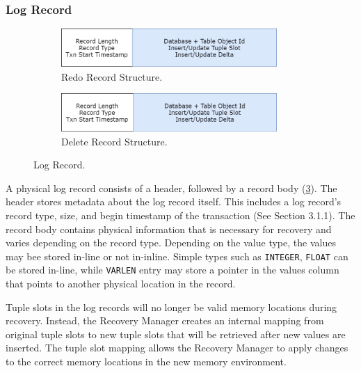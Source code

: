 \documentclass[12pt]{cmuthesis}
\begin{document}
\subsubsection{Log Record}
\begin{figure}[t!]
\centering
\begin{subfigure}{.5\textwidth}
 \centering
 \includegraphics[width=0.9\textwidth]{images/RedoRecord.png}
 \caption{Redo Record Structure.}
  \label{fig:pipeline_graph}
\end{subfigure}%
\begin{subfigure}{.5\textwidth}
 \centering
 \includegraphics[width=0.9\textwidth]{images/DeleteRecord.png}
 \caption{Delete Record Structure.}
  \label{fig:pipeline_code}
\end{subfigure}
\caption{Log Record.}
\label{fig:log_record}
\end{figure}

A physical log record consists of a header, followed by a record body (\cref{fig:log_record}). The header stores metadata about the log record itself. This includes a log record's record type, size, and begin timestamp of the transaction (See Section 3.1.1). The record body contains physical information that is necessary for recovery and varies depending on the record type. Depending on the value type, the values may bee stored in-line or not in-inline. Simple types such as \texttt{INTEGER}, \texttt{FLOAT} can be stored in-line, while \texttt{VARLEN} entry may store a pointer in the values column that points to another physical location in the record.

Tuple slots in the log records will no longer be valid memory locations during recovery. Instead, the Recovery Manager creates an internal mapping from original tuple slots to new tuple slots that will be retrieved after new values are inserted. The tuple slot mapping allows the Recovery Manager to apply changes to the correct memory locations in the new memory environment.
\end{document}
